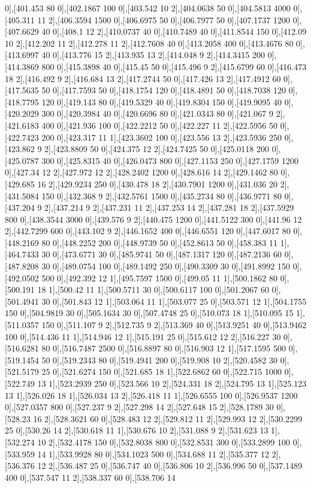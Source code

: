 {0],[401.453 80 0],[402.1867 100 0],[403.542 10 2],[404.0638 50 0],[404.5813 4000 0],[405.311 11 2],[406.3594 1500 0],[406.6975 50 0],[406.7977 50 0],[407.1737 1200 0],[407.6629 40 0],[408.1 12 2],[410.0737 40 0],[410.7489 40 0],[411.8544 150 0],[412.09 10 2],[412.202 11 2],[412.278 11 2],[412.7608 40 0],[413.2058 400 0],[413.4676 80 0],[413.6997 40 0],[413.776 15 2],[413.935 13 2],[414.048 9 2],[414.3415 200 0],[414.3869 800 0],[415.3898 40 0],[415.45 50 0],[415.496 9 2],[415.6799 60 0],[416.473 18 2],[416.492 9 2],[416.684 13 2],[417.2744 50 0],[417.426 13 2],[417.4912 60 0],[417.5635 50 0],[417.7593 50 0],[418.1754 120 0],[418.4891 50 0],[418.7038 120 0],[418.7795 120 0],[419.143 80 0],[419.5329 40 0],[419.8304 150 0],[419.9095 40 0],[420.2029 300 0],[420.3984 40 0],[420.6696 80 0],[421.0343 80 0],[421.067 9 2],[421.6183 400 0],[421.936 100 0],[422.2212 50 0],[422.227 11 2],[422.5956 50 0],[422.7423 200 0],[423.317 11 1],[423.3602 100 0],[423.556 13 2],[423.5936 250 0],[423.862 9 2],[423.8809 50 0],[424.375 12 2],[424.7425 50 0],[425.0118 200 0],[425.0787 300 0],[425.8315 40 0],[426.0473 800 0],[427.1153 250 0],[427.1759 1200 0],[427.34 12 2],[427.972 12 2],[428.2402 1200 0],[428.616 14 2],[429.1462 80 0],[429.685 16 2],[429.9234 250 0],[430.478 18 2],[430.7901 1200 0],[431.036 20 2],[431.5084 150 0],[432.368 9 2],[432.5761 1500 0],[435.2734 80 0],[436.9771 80 0],[437.204 9 2],[437.214 9 2],[437.231 11 2],[437.253 14 2],[437.281 18 2],[437.5929 800 0],[438.3544 3000 0],[439.576 9 2],[440.475 1200 0],[441.5122 300 0],[441.96 12 2],[442.7299 600 0],[443.102 9 2],[446.1652 400 0],[446.6551 120 0],[447.6017 80 0],[448.2169 80 0],[448.2252 200 0],[448.9739 50 0],[452.8613 50 0],[458.383 11 1],[464.7433 30 0],[473.6771 30 0],[485.9741 50 0],[487.1317 120 0],[487.2136 60 0],[487.8208 30 0],[489.0754 100 0],[489.1492 250 0],[490.3309 30 0],[491.8992 150 0],[492.0502 500 0],[492.392 12 1],[495.7597 1500 0],[499.05 11 1],[500.1862 80 0],[500.191 18 1],[500.42 11 1],[500.5711 30 0],[500.6117 100 0],[501.2067 60 0],[501.4941 30 0],[501.843 12 1],[503.064 11 1],[503.077 25 0],[503.571 12 1],[504.1755 150 0],[504.9819 30 0],[505.1634 30 0],[507.4748 25 0],[510.073 18 1],[510.095 15 1],[511.0357 150 0],[511.107 9 2],[512.735 9 2],[513.369 40 0],[513.9251 40 0],[513.9462 100 0],[514.436 11 1],[514.946 12 1],[515.191 25 0],[515.612 12 2],[516.227 30 0],[516.6281 80 0],[516.7487 2500 0],[516.8897 80 0],[516.903 12 1],[517.1595 500 0],[519.1454 50 0],[519.2343 80 0],[519.4941 200 0],[519.908 10 2],[520.4582 30 0],[521.5179 25 0],[521.6274 150 0],[521.685 18 1],[522.6862 60 0],[522.715 1000 0],[522.749 13 1],[523.2939 250 0],[523.566 10 2],[524.331 18 2],[524.795 13 1],[525.123 13 1],[526.026 18 1],[526.034 13 2],[526.418 11 1],[526.6555 100 0],[526.9537 1200 0],[527.0357 800 0],[527.237 9 2],[527.298 14 2],[527.648 15 2],[528.1789 30 0],[528.23 16 2],[528.3621 60 0],[528.483 12 2],[529.812 11 2],[529.993 12 2],[530.2299 25 0],[530.26 14 2],[530.618 11 1],[530.676 10 2],[531.088 9 2],[531.623 13 1],[532.274 10 2],[532.4178 150 0],[532.8038 800 0],[532.8531 300 0],[533.2899 100 0],[533.959 14 1],[533.9928 80 0],[534.1023 500 0],[534.688 11 2],[535.377 12 2],[536.376 12 2],[536.487 25 0],[536.747 40 0],[536.806 10 2],[536.996 50 0],[537.1489 400 0],[537.547 11 2],[538.337 60 0],[538.706 14 }
